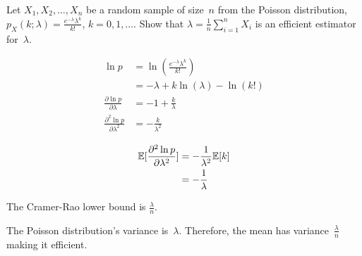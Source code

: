 \begin{problem}
   Let ${X_1,X_2,\ldots,X_n}$ be a random sample of size~$n$ from the Poisson distribution, ${p_{X}(k;\lambda) = \frac{e^{-\lambda} \lambda^{k}}{k!}}$, ${k=0,1,\ldots}$. Show that ${\hat{\lambda} = \frac{1}{n} \sum_{i=1}^{n} X_i}$ is an efficient estimator for~$\lambda$.
\end{problem}

\begin{align}
  \ln p &= \ln \left( \frac{e^{-\lambda} \lambda^{k}}{k!} \right) \\
        &= -\lambda + k\ln(\lambda) - \ln(k!) \\
  \frac{\partial \ln p}{\partial \lambda} &= -1 +\frac{k}{\lambda} \\
  \frac{\partial^2 \ln p}{\partial \lambda^2} &= -\frac{k}{\lambda^2}
\end{align}

\begin{align}
  \mathbb{E}\lbrack\frac{\partial^2 \ln p}{\partial \lambda^2}\rbrack &= -\frac{1}{\lambda^2} \mathbb{E}\lbrack k\rbrack \\
                                                       &= -\frac{1}{\lambda}
\end{align}

The Cramer-Rao lower bound is ${\boxed{\frac{\lambda}{n}}}$.

The Poisson distribution's variance is~$\lambda$.  Therefore, the mean has variance~${\frac{\lambda}{n}}$ making it efficient.
